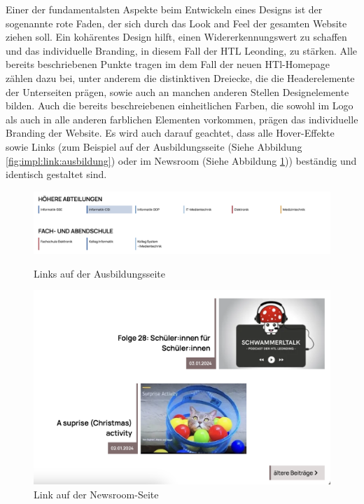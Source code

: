 Einer der fundamentalsten Aspekte beim Entwickeln eines Designs ist der sogenannte rote Faden, der sich durch das Look and Feel der gesamten
Website ziehen soll. Ein kohärentes Design hilft, einen Widererkennungswert zu schaffen und das individuelle Branding, in diesem Fall der HTL Leonding,
zu stärken. Alle bereits beschriebenen Punkte tragen im dem Fall der neuen HTl-Homepage zählen dazu bei, unter anderem die distinktiven Dreiecke, die
die Headerelemente der Unterseiten prägen, sowie auch an manchen anderen Stellen Designelemente bilden. Auch die bereits beschreiebenen
einheitlichen Farben, die sowohl im Logo als auch in alle anderen farblichen Elementen vorkommen, prägen das individuelle Branding der Website.
Es wird auch darauf geachtet, dass alle Hover-Effekte sowie Links (zum Beispiel auf der Ausbildungsseite (Siehe Abbildung \ref{fig:impl:link:ausbildung}) oder
 im Newsroom (Siehe Abbildung \ref{fig:impl:link:news})) beständig und identisch gestaltet sind.
\begin{figure}
   \begin{minipage}[b]{.4\linewidth} 
      \includegraphics[width=\linewidth]{pics/beispiel links ausbildung.png}
      \caption{Links auf der Ausbildungsseite}
      \label{fig:impl:link:ausbildung}
   \end{minipage}
   \hspace{.05\linewidth}
   \begin{minipage}[b]{.4\linewidth}
      \includegraphics[width=\linewidth]{pics/beispiel links newsroom.png}
      \caption{Link auf der Newsroom-Seite}
      \label{fig:impl:link:news}
   \end{minipage}
\end{figure}

